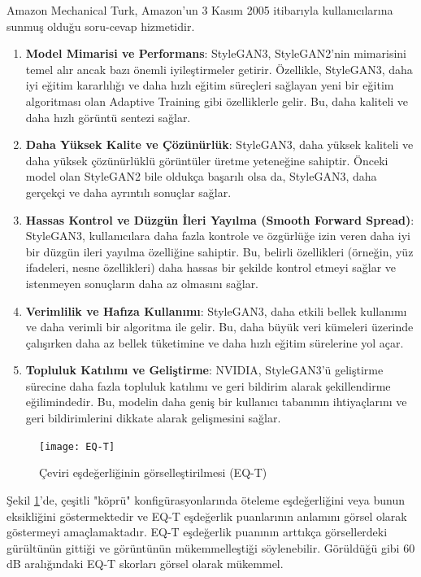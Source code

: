 \documentclass[12pt, a4paper]{article}
\begin{document}
	Amazon Mechanical Turk, Amazon'un 3 Kasım 2005 itibarıyla kullanıcılarına sunmuş olduğu soru-cevap hizmetidir. 
	\begin{enumerate}
		\item \textbf{Model Mimarisi ve Performans}: StyleGAN3, StyleGAN2'nin mimarisini temel alır ancak bazı önemli iyileştirmeler getirir. Özellikle, StyleGAN3, daha iyi eğitim kararlılığı ve daha hızlı eğitim süreçleri sağlayan yeni bir eğitim algoritması olan Adaptive Training gibi özelliklerle gelir. Bu, daha kaliteli ve daha hızlı görüntü sentezi sağlar.
		
		\item \textbf{Daha Yüksek Kalite ve Çözünürlük}: StyleGAN3, daha yüksek kaliteli ve daha yüksek çözünürlüklü görüntüler üretme yeteneğine sahiptir. Önceki model olan StyleGAN2 bile oldukça başarılı olsa da, StyleGAN3, daha gerçekçi ve daha ayrıntılı sonuçlar sağlar.
		
		\item \textbf{Hassas Kontrol ve Düzgün İleri Yayılma (Smooth Forward Spread)}: StyleGAN3, kullanıcılara daha fazla kontrole ve özgürlüğe izin veren daha iyi bir düzgün ileri yayılma özelliğine sahiptir. Bu, belirli özellikleri (örneğin, yüz ifadeleri, nesne özellikleri) daha hassas bir şekilde kontrol etmeyi sağlar ve istenmeyen sonuçların daha az olmasını sağlar.
		
		\item \textbf{Verimlilik ve Hafıza Kullanımı}: StyleGAN3, daha etkili bellek kullanımı ve daha verimli bir algoritma ile gelir. Bu, daha büyük veri kümeleri üzerinde çalışırken daha az bellek tüketimine ve daha hızlı eğitim sürelerine yol açar.
		
		\item \textbf{Topluluk Katılımı ve Geliştirme}: NVIDIA, StyleGAN3'ü geliştirme sürecine daha fazla topluluk katılımı ve geri bildirim alarak şekillendirme eğilimindedir. Bu, modelin daha geniş bir kullanıcı tabanının ihtiyaçlarını ve geri bildirimlerini dikkate alarak gelişmesini sağlar.
		
	\end{enumerate}
	
	\begin{figure}[h]
		\centering
		\texttt{[image: EQ-T]}		
		\caption{Çeviri eşdeğerliğinin görselleştirilmesi (EQ-T)\cite{-2024-05-31}}
		\label{EQ-T}
	\end{figure}
	
	Şekil \ref{EQ-T}'de, çeşitli "köprü" konfigürasyonlarında öteleme eşdeğerliğini veya bunun eksikliğini göstermektedir ve EQ-T eşdeğerlik puanlarının anlamını görsel olarak göstermeyi amaçlamaktadır. EQ-T eşdeğerlik puanının arttıkça görsellerdeki gürültünün gittiği ve görüntünün mükemmelleştiği söylenebilir. Görüldüğü gibi 60 dB aralığındaki EQ-T skorları görsel olarak mükemmel\cite{-2024-05-31}.
	
\end{document}

